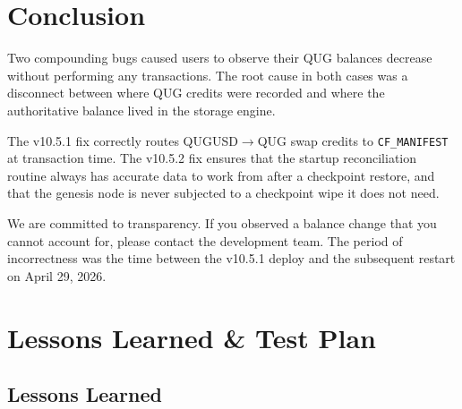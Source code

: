 \documentclass[11pt,a4paper]{article}
\begin{document}
\section{Conclusion}

Two compounding bugs caused users to observe their QUG balances decrease
without performing any transactions.  The root cause in both cases was a
disconnect between where QUG credits were recorded and where the authoritative
balance lived in the storage engine.

The v10.5.1 fix correctly routes QUGUSD$\to$QUG swap credits to
\texttt{CF\_MANIFEST} at transaction time.  The v10.5.2 fix ensures that the
startup reconciliation routine always has accurate data to work from after a
checkpoint restore, and that the genesis node is never subjected to a
checkpoint wipe it does not need.

We are committed to transparency.  If you observed a balance change that you
cannot account for, please contact the development team.  The period of
incorrectness was the time between the v10.5.1 deploy and the subsequent
restart on April 29, 2026.

\appendix
\section{Lessons Learned \& Test Plan}

\subsection{Lessons Learned}
\end{document}
